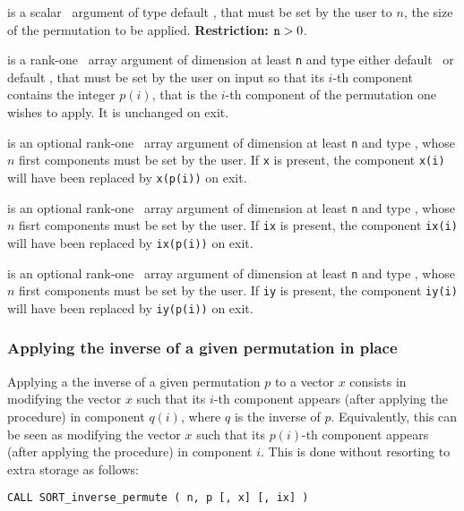 \documentclass{galahad}
\newcommand{\packagename}{SORT}
\begin{document}
\begin{description}
 is a scalar \intentin\ argument of type default
\integer, that must be set by the user to $n$, the size of the permutation to
be applied.
{\bf Restriction:} ${\tt n} > 0$. 
 
 is a rank-one \intentinout\ array argument of
dimension at least {\tt n} and type either default
\integer\ or default \realdp, that must be set by the user 
on input so that its $i$-th component contains the integer $p(i)$, that is the
$i$-th component of the permutation one wishes to apply.
It is unchanged on exit.

 is an optional rank-one \intentinout\ array argument of
dimension at least {\tt n} and type \realdp, whose $n$ first components must
be set by the user. If {\tt x} is present, the component {\tt x(i)} will have
been replaced by {\tt x(p(i))} on exit.

 is an optional rank-one \intentinout\ array argument of
dimension at least {\tt n} and type \integer, whose $n$ fisrt components must
be set by the user. If {\tt ix} is present, the component {\tt ix(i)} will have
been replaced by {\tt ix(p(i))} on exit.

 is an optional rank-one \intentinout\ array argument of
dimension at least {\tt n} and type \integer, whose $n$ first components must
be set by the user. If {\tt iy} is present, the component {\tt iy(i)} will have
been replaced by {\tt iy(p(i))} on exit.
\end{description}

\subsubsection{Applying the inverse of a given permutation in place}

Applying a the inverse of a given permutation $p$ to a vector $x$ consists in
modifying the vector $x$ such that its $i$-th component appears (after
applying the procedure) in component $q(i)$, where $q$ is the inverse of
$p$. Equivalently, this can be seen as modifying the vector $x$ such that its
$p(i)$-th component appears (after applying the procedure) in component $i$.
This is done without resorting to extra storage as follows:
\vspace*{1mm}

{\tt CALL \packagename\_inverse\_permute ( n, p [, x] [, ix] )}
\end{document}

